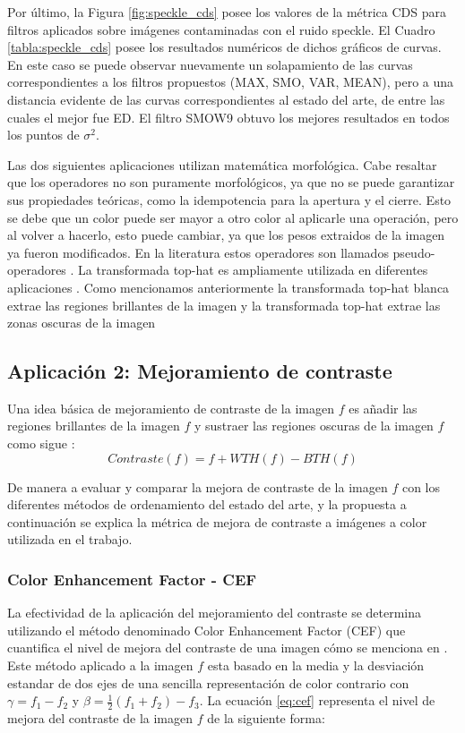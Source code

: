 Por último, la Figura \ref{fig:speckle_cds} posee los valores de la métrica CDS para filtros aplicados sobre imágenes contaminadas con el ruido speckle. El Cuadro \ref{tabla:speckle_cds} posee los resultados numéricos de dichos gráficos de curvas. En este caso se puede observar nuevamente un solapamiento de las curvas correspondientes a los filtros propuestos (MAX, SMO, VAR, MEAN), pero a una distancia evidente de las curvas correspondientes al estado del arte, de entre las cuales el mejor fue ED. El filtro SMOW9 obtuvo los mejores resultados en todos los puntos de $\sigma^2$.

Las dos siguientes aplicaciones utilizan matemática morfológica. Cabe resaltar que los operadores no son puramente morfológicos, ya que no se puede garantizar sus propiedades teóricas, como la idempotencia para la apertura y el cierre. Esto se debe que un color puede ser mayor a otro color al aplicarle una operación, pero al volver a hacerlo, esto puede cambiar, ya que los pesos extraidos de la imagen ya fueron modificados. En la literatura estos operadores son llamados pseudo-operadores \cite{hanbury2001morphological,aptoula2007pseudo,aptoula2008alpha,angulo2010pseudo,chen2002pseudo}. 
La transformada top-hat es ampliamente utilizada en diferentes aplicaciones \cite{soille2013morphological,mukhopadhyay2000multiscale,soille1997note,bai2010analysis,bai2010infrared,bai2010analysis1}. Como mencionamos anteriormente la transformada top-hat blanca extrae las regiones brillantes de la imagen y la transformada top-hat extrae las zonas oscuras de la imagen

\subsection{Aplicación 2: Mejoramiento de contraste}
 Una idea b\'asica de mejoramiento de contraste  de la imagen $f$ es a\~nadir las regiones brillantes de la imagen $f$ y sustraer las regiones oscuras de la imagen $f$ como sigue \cite{soille2013morphological}:
\begin{equation}
\label{contraste}
Contraste(f) = f + WTH(f) - BTH(f) 
\end{equation}

De manera a evaluar y comparar la mejora de contraste de la imagen $f$ con los diferentes métodos de ordenamiento del estado del arte, y la propuesta a continuación se explica la métrica de mejora de contraste a imágenes a color utilizada en el trabajo.

\subsubsection{Color Enhancement Factor - CEF}
La efectividad de la aplicación del mejoramiento del contraste se determina utilizando el método denominado Color Enhancement Factor (CEF) que cuantifica el nivel de mejora del contraste de una imagen cómo se menciona en \cite{susstrunk2003color}. Este método aplicado a la imagen $f$ esta basado en la media y la desviación estandar de dos ejes de una sencilla representación de color contrario con $\gamma = f_1 - f_2$ y $\beta = \frac{1}{2}(f_1 + f_2) - f_3$.
La ecuación \ref{eq:cef} representa el nivel de mejora del contraste de la imagen $f$ de la siguiente forma:

